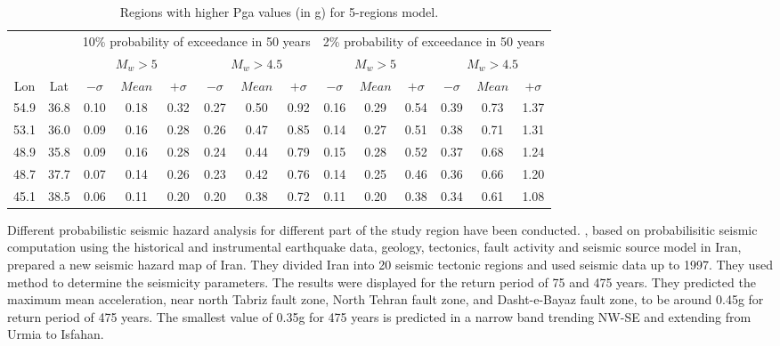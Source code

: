 \begin{table}[!ht]
\centering
\caption{ Regions with higher Pga values (in g) for 5-regions model. }
\begin{tabular}{ cccccccccccccc}


	
	& & \multicolumn{6}{c}{10\% probability of exceedance in 50 years} & \multicolumn{6}{c}{2\% probability of exceedance in 50 years}    \\ 
	\cline{3-14}   & & \multicolumn{3}{c}{ $M_w > 5$ } & \multicolumn{3}{c}{ $M_w > 4.5$} & \multicolumn{3}{c}{ $M_w > 5$ } & \multicolumn{3}{c}{ $M_w > 4.5$ } \\ 
	\cline{3-14}    Lon & Lat & $-\sigma $ & $Mean$ & $+\sigma$ & $-\sigma $& $Mean$ &$+\sigma$& $-\sigma $ & $Mean$ & $+\sigma$& $-\sigma $ & $Mean$ & $+\sigma$ \\ \hline
	54.9	&	36.8	&	0.10	&	0.18	&	0.32	&	0.27	&	0.50	&	0.92	&	0.16	&	0.29	&	0.54	&	0.39	&	0.73	&	1.37 \\ \hline
	53.1	&	36.0 	&	0.09	&	0.16	&	0.28	&	0.26	&	0.47	&	0.85	&	0.14	&	0.27	&	0.51	&	0.38	&	0.71	&	1.31 \\ \hline
	48.9	&	35.8	&	0.09	&	0.16	&	0.28	&	0.24	&	0.44	&	0.79	&	0.15	&	0.28	&	0.52	&	0.37	&	0.68	&	1.24 \\ \hline
	48.7	&	37.7	&	0.07	&	0.14	&	0.26	&	0.23	&	0.42	&	0.76	&	0.14	&	0.25	&	0.46	&	0.36	&	0.66	&	1.20 \\ \hline
	45.1	&	38.5	&	0.06	&	0.11	&	0.20	&	0.20	&	0.38	&	0.72	&	0.11	&	0.20	&	0.38	&	0.34	&	0.61	&	1.08 \\ \hline
	 
\end{tabular}
\label{tab:pga_values_models}
\end{table}








\noindent
Different probabilistic seismic hazard analysis for different part of the study region have been conducted. 
\citet{Tavakoli1999}, based on probabilisitic seismic computation using the historical and instrumental earthquake data, geology, tectonics, fault activity and seismic source model in Iran, prepared a new seismic hazard map of Iran. They divided Iran into 20 seismic tectonic regions and used seismic data up to 1997. They used \citet{Kijko1992} method  to determine the seismicity parameters.
The results were displayed for the return period of 75 and 475 years. They predicted the maximum mean acceleration, near north Tabriz fault zone, North Tehran fault zone, and Dasht-e-Bayaz fault zone, to be around 0.45g for return period of 475 years. The smallest value of 0.35g for 475 years is predicted in a narrow band trending NW-SE and extending from Urmia to Isfahan.  

